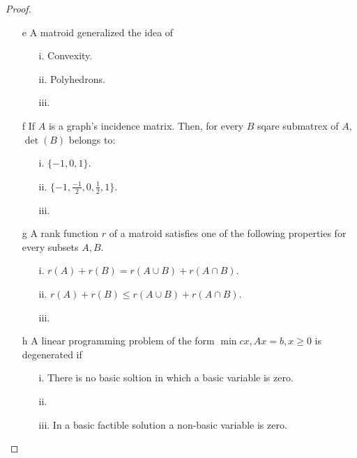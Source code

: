 \begin{proof}
\begin{itemize}
        \item[e] A matroid generalized the idea of
                    \begin{itemize}
                        \item[i.] Convexity.
                        \item[ii.] Polyhedrons.
                        \item[iii.] 
                    \end{itemize}

        \item[f] If $A$ is a graph's incidence matrix. Then, for every $B$ sqare submatrex of $A$, 
                 $\det(B)$ belongs to:
                    \begin{itemize}
                        \item[i.] $\{-1, 0, 1\}$.
                        \item[ii.] $\{-1, \frac{-1}{2}, 0, \frac{1}{2}, 1\}$.
                        \item[iii.] 
                    \end{itemize}

        \item[g] A rank function $r$ of a matroid satisfies one of the following properties for every
                subsets $A, B$.
                    \begin{itemize}
                        \item[i.] $r(A) + r(B) = r(A \cup B) + r(A \cap B)$.
                        \item[ii.] $r(A) + r(B) \leq r(A \cup B) + r(A \cap B)$.
                        \item[iii.] 
                    \end{itemize}

        \item[h] A linear programming problem of the form $\min cx, Ax = b, x \geq 0$ is degenerated if
                    \begin{itemize}
                        \item[i.] There is no basic soltion in which a basic variable is zero.
                        \item[ii.]  
                        \item[iii.] In a basic factible solution a non-basic variable is zero.
                    \end{itemize}


\end{itemize}
\end{proof}
